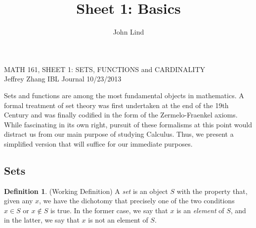 \documentclass[12pt]{article}
\title{Sheet 1: Basics}
\author{John Lind}
\theoremstyle{definition}
\newtheorem{definition}[theorem]{Definition}
\numberwithin{equation}{subsection}
\begin{document}
\pagestyle{plain}


\setcounter{section}{1}   

\begin{center}
{\large MATH 161, SHEET 1: SETS, FUNCTIONS and CARDINALITY} \\ 
\vspace{.2in}  
Jeffrey Zhang IBL Journal 10/23/2013
\end{center}

\bigskip \bigskip

\medskip

Sets and functions are among the most fundamental objects in mathematics.  A formal treatment
of set theory was first undertaken at the end of the 19th Century and was finally codified
in the form of the Zermelo-Fraenkel axioms.  While fascinating in its own right, pursuit of these
formalisms at this point would distract us from our main purpose of studying Calculus.  Thus, we
present a simplified version that will suffice for our immediate purposes.


\subsection*{Sets}

\begin{definition} (Working Definition)
A {\em set} is an object $S$ with the property that, given any $x$, we have the dichotomy that precisely
one of the two conditions $x\in S$ or $x\not\in S$ is true.  In the former case, we say that $x$ is an 
{\em element} of $S$, and in the latter, we say that $x$ is not an element of $S$.
\end{definition}
\end{document}
